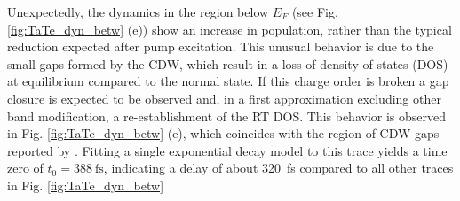 Unexpectedly, the dynamics in the region below $E_F$ (see Fig. \ref{fig:TaTe_dyn_betw} (e)) show an increase in population, rather than the typical reduction expected after pump excitation.
This unusual behavior is due to the small gaps formed by the CDW, which result in a loss of density of states (DOS) at equilibrium compared to the normal state.
If this charge order is broken a gap closure is expected to be observed and, in a first approximation excluding other band modification, a re-establishment of the RT DOS.
This behavior is observed in Fig. \ref{fig:TaTe_dyn_betw} (e), which coincides with the region of CDW gaps reported by \cite{lin_evidence_2022}.
Fitting a single exponential decay model to this trace yields a time zero of $t_0=\qty{388}{\femto\second}$, indicating a delay of about \qty{320}{\femto\second} compared to all other traces in Fig. \ref{fig:TaTe_dyn_betw}


